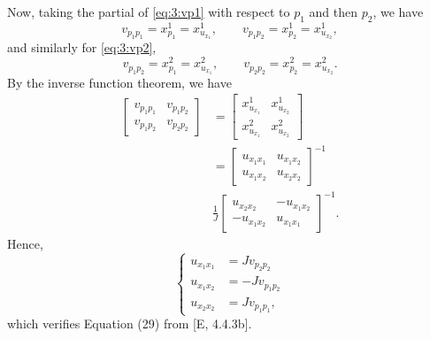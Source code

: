 \begin{solution}
  Now, taking the partial of \eqref{eq:3:vp1} with respect to \(p_1\) and
  then \(p_2\), we have
  \begin{equation}
    \label{eq:3:vp1-p1-p2}
    v_{p_1p_1}=x^1_{p_1}=x^1_{u_{x_1}}, \qquad v_{p_1p_2}=x^1_{p_2}=x^1_{u_{x_2}},
  \end{equation}
  and similarly for \eqref{eq:3:vp2},
  \begin{equation}
    \label{eq:3:vp2-p1-p2}
    v_{p_1p_2}=x^2_{p_1}=x^2_{u_{x_1}},\qquad v_{p_2p_2}=x^2_{p_2}=x^2_{u_{x_2}}.
  \end{equation}
  By the inverse function theorem, we have
  \begin{align*}
    \begin{bmatrix}
      v_{p_1p_1}&v_{p_1p_2}\\
      v_{p_1p_2}&v_{p_2p_2}
    \end{bmatrix}
    &=
      \begin{bmatrix}
        x^1_{u_{x_1}}&x^1_{u_{x_2}}\\
        x^2_{u_{x_1}}&x^2_{u_{x_2}}
      \end{bmatrix}
    \\
    &=\begin{bmatrix}
      u_{x_1x_1}&u_{x_1x_2}\\
      u_{x_1x_2}&u_{x_2x_2}
    \end{bmatrix}^{-1}\\
    &\frac{1}{J}
      \begin{bmatrix}
      u_{x_2x_2}&-u_{x_1x_2}\\
      -u_{x_1x_2}&u_{x_1x_1}
    \end{bmatrix}^{-1}.
  \end{align*}
  Hence,
  \begin{equation}
    \label{eq:3:verified-29}
    \left\{
      \begin{aligned}
        u_{x_1x_1}&=Jv_{p_2p_2}\\
        u_{x_1x_2}&=-Jv_{p_1p_2}\\
        u_{x_2x_2}&=Jv_{p_1p_1},
      \end{aligned}
    \right.
  \end{equation}
  which verifies Equation (29) from [E, 4.4.3b].
\end{solution}
\newpage
